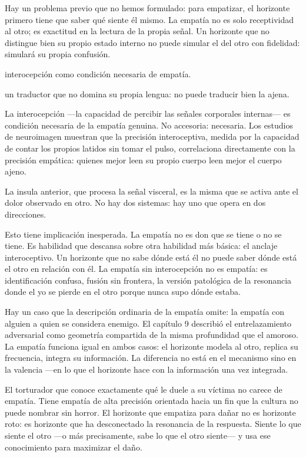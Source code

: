 \noindent Hay un problema previo que no hemos formulado: para empatizar, el horizonte primero tiene que saber qué siente él mismo. La empatía no es solo receptividad al otro; es exactitud en la lectura de la propia señal. Un horizonte que no distingue bien su propio estado interno no puede simular el del otro con fidelidad: simulará su propia confusión.

\begin{fisica}
 interocepción como condición necesaria de empatía.

 un traductor que no domina su propia lengua: no puede traducir bien la ajena.
\end{fisica}
La interocepción —la capacidad de percibir las señales corporales internas— es condición necesaria de la empatía genuina. No accesoria: necesaria. Los estudios de neuroimagen muestran que la precisión interoceptiva, medida por la capacidad de contar los propios latidos sin tomar el pulso, correlaciona directamente con la precisión empática: quienes mejor leen su propio cuerpo leen mejor el cuerpo ajeno.

La insula anterior, que procesa la señal visceral, es la misma que se activa ante el dolor observado en otro. No hay dos sistemas: hay uno que opera en dos direcciones.

Esto tiene implicación inesperada. La empatía no es don que se tiene o no se tiene. Es habilidad que descansa sobre otra habilidad más básica: el anclaje interoceptivo. Un horizonte que no sabe dónde está él no puede saber dónde está el otro en relación con él. La empatía sin interocepción no es empatía: es identificación confusa, fusión sin frontera, la versión patológica de la resonancia donde el yo se pierde en el otro porque nunca supo dónde estaba.

\noindent Hay un caso que la descripción ordinaria de la empatía omite: la empatía con alguien a quien se considera enemigo. El capítulo 9 describió el entrelazamiento adversarial como geometría compartida de la misma profundidad que el amoroso. La empatía funciona igual en ambos casos: el horizonte modela al otro, replica su frecuencia, integra su información. La diferencia no está en el mecanismo sino en la valencia —en lo que el horizonte hace con la información una vez integrada.

El torturador que conoce exactamente qué le duele a su víctima no carece de empatía. Tiene empatía de alta precisión orientada hacia un fin que la cultura no puede nombrar sin horror. El horizonte que empatiza para dañar no es horizonte roto: es horizonte que ha desconectado la resonancia de la respuesta. Siente lo que siente el otro —o más precisamente, sabe lo que el otro siente— y usa ese conocimiento para maximizar el daño.

